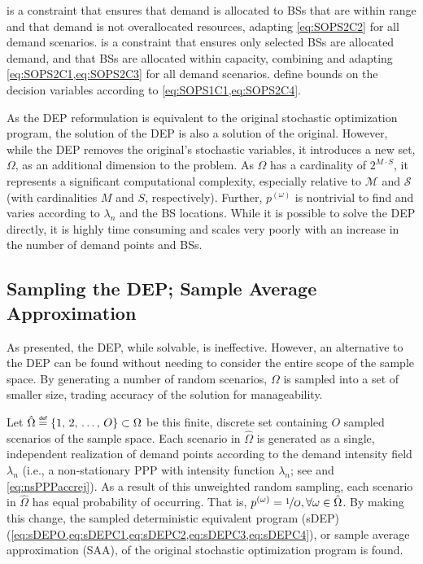 \documentclass[12pt,dvipsnames]{report}
\newcommand\defeq{\mathrel{\overset{\makebox[0pt]{\mbox{\normalfont\tiny\sffamily def}}}{=}}}
\begin{document}
 is a constraint that ensures that demand is allocated to BSs that are within range and that demand is not overallocated resources, adapting \cref{eq:SOPS2C2} for all demand scenarios.   is a constraint that ensures only selected BSs are allocated demand, and that BSs are allocated within capacity, combining and adapting \cref{eq:SOPS2C1,eq:SOPS2C3} for all demand scenarios.   define bounds on the decision variables according to \cref{eq:SOPS1C1,eq:SOPS2C4}.

As the DEP reformulation is equivalent to the original stochastic optimization program, the solution of the DEP is also a solution of the original.  However, while the DEP removes the original's stochastic variables, it introduces a new set, $\Omega$, as an additional dimension to the problem.  As $\Omega$ has a cardinality of $2^{M \cdot S}$, it represents a significant computational complexity, especially relative to $\mathcal{M}$ and $\mathcal{S}$ (with cardinalities $M$ and $S$, respectively).  Further, $p^{\left( \omega \right)}$ is nontrivial to find and varies according to $\lambda_n$ and the BS locations.  While it is possible to solve the DEP directly, it is highly time consuming and scales very poorly with an increase in the number of demand points and BSs.

\subsection{Sampling the DEP; Sample Average Approximation} \label{subsec:dep_sampling}

As presented, the DEP, while solvable, is ineffective.  However, an alternative to the DEP can be found without needing to consider the entire scope of the sample space.  By generating a number of random scenarios, $\Omega$ is sampled into a set of smaller size, trading accuracy of the solution for manageability.

Let $\hat{\Omega} \defeq \left\{ 1,\, 2,\, \ldots,\, O \right\} \subset \Omega$ be this finite, discrete set containing $O$ sampled scenarios of the sample space.  Each scenario in $\hat{\Omega}$ is generated as a single, independent realization of demand points according to the demand intensity field $\lambda_n$ (i.e., a non-stationary PPP with intensity function $\lambda_n$; see  and \cref{eq:nsPPPaccrej}).  As a result of this unweighted random sampling, each scenario in $\hat{\Omega}$ has equal probability of occurring.  That is, $p^{\left( \omega \right)} = \nicefrac{1}{O}, \forall \omega \in \hat{\Omega}$.  By making this change, the sampled deterministic equivalent program (sDEP) (\cref{eq:sDEPO,eq:sDEPC1,eq:sDEPC2,eq:sDEPC3,eq:sDEPC4}), or sample average approximation (SAA), of the original stochastic optimization program is found.
\end{document}
